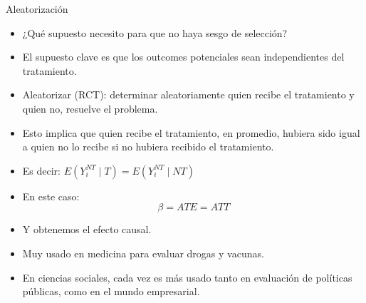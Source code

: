 \documentclass[10pt]{beamer}
\begin{document}
\begin{frame}{Aleatorización}
    \begin{itemize}
        \item ¿Qué supuesto necesito para que no haya sesgo de selecci\'on?
        \item El supuesto clave es que los outcomes potenciales sean independientes del tratamiento.
        \item Aleatorizar (RCT): determinar aleatoriamente quien recibe el tratamiento y quien no, resuelve el problema.
        \item Esto implica que quien recibe el tratamiento, en promedio, hubiera sido igual a quien no lo recibe si no hubiera recibido el tratamiento.
        \item Es decir: $E\left(Y_{i}^{N T} \mid T\right)=E\left(Y_{i}^{N T} \mid N T\right)$
        \item En este caso:
        $$
        \beta=A T E=A T T
        $$
        \item Y obtenemos el efecto causal.
        \item Muy usado en medicina para evaluar drogas y vacunas.
        \item En ciencias sociales, cada vez es más usado tanto en evaluación de políticas públicas, como  en el mundo empresarial. 
    \end{itemize}
\end{frame}

\end{document}
